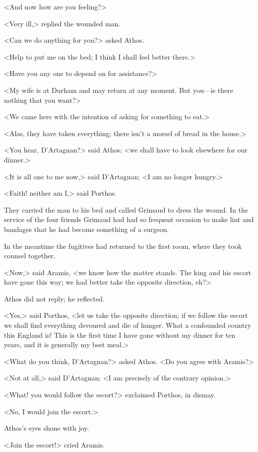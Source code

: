 <And now how are you feeling?>

<Very ill,> replied the wounded man.

<Can we do anything for you?> asked Athos.

<Help to put me on the bed; I think I shall feel better there.>

<Have you any one to depend on for assistance?>

<My wife is at Durham and may return at any moment. But you—is there nothing that you want?>

<We came here with the intention of asking for something to eat.>

<Alas, they have taken everything; there isn't a morsel of bread in the house.>

<You hear, D'Artagnan?> said Athos; <we shall have to look elsewhere for our dinner.>

<It is all one to me now,> said D'Artagnan; <I am no longer hungry.>

<Faith! neither am I,> said Porthos.

They carried the man to his bed and called Grimaud to dress the wound. In the service of the four friends Grimaud had had so frequent occasion to make lint and bandages that he had become something of a surgeon.

In the meantime the fugitives had returned to the first room, where they took counsel together.

<Now,> said Aramis, <we know how the matter stands. The king and his escort have gone this way; we had better take the opposite direction, eh?>

Athos did not reply; he reflected.

<Yes,> said Porthos, <let us take the opposite direction; if we follow the escort we shall find everything devoured and die of hunger. What a confounded country this England is! This is the first time I have gone without my dinner for ten years, and it is generally my best meal.>

<What do you think, D'Artagnan?> asked Athos. <Do you agree with Aramis?>

<Not at all,> said D'Artagnan; <I am precisely of the contrary opinion.>

<What! you would follow the escort?> exclaimed Porthos, in dismay.

<No, I would join the escort.>

Athos's eyes shone with joy.

<Join the escort!> cried Aramis.

